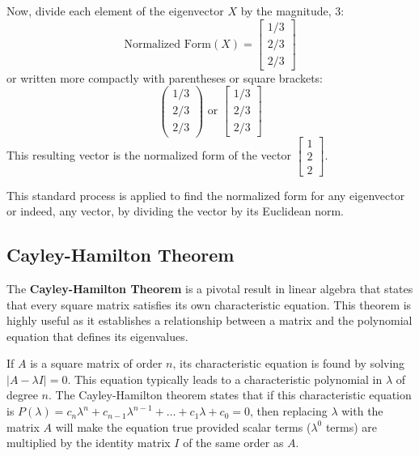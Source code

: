 \documentclass{article}
\begin{document}
Now, divide each element of the eigenvector $X$ by the magnitude, 3:
\[ \text{Normalized Form} (X) = \begin{bmatrix} 1 / 3 \\ 2 / 3 \\ 2 / 3 \end{bmatrix} \]
or written more compactly with parentheses or square brackets:
\[ \begin{pmatrix} 1/3 \\ 2/3 \\ 2/3 \end{pmatrix} \text{ or } \begin{bmatrix} 1/3 \\ 2/3 \\ 2/3 \end{bmatrix} \]
This resulting vector is the normalized form of the vector $\begin{bmatrix} 1 \\ 2 \\ 2 \end{bmatrix}$.

This standard process is applied to find the normalized form for any eigenvector or indeed, any vector, by dividing the vector by its Euclidean norm.



\subsection{Cayley-Hamilton Theorem} %

The \textbf{Cayley-Hamilton Theorem} is a pivotal result in linear algebra that states that every square matrix satisfies its own characteristic equation. This theorem is highly useful as it establishes a relationship between a matrix and the polynomial equation that defines its eigenvalues.

If $A$ is a square matrix of order $n$, its characteristic equation is found by solving $|A - \lambda I| = 0$. This equation typically leads to a characteristic polynomial in $\lambda$ of degree $n$. The Cayley-Hamilton theorem states that if this characteristic equation is $P(\lambda) = c_n \lambda^n + c_{n-1}\lambda^{n-1} + \dots + c_1 \lambda + c_0 = 0$, then replacing $\lambda$ with the matrix $A$ will make the equation true provided scalar terms ($\lambda^0$ terms) are multiplied by the identity matrix $I$ of the same order as $A$.
\end{document}
